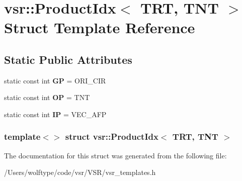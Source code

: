 \hypertarget{structvsr_1_1_product_idx_3_01_t_r_t_00_01_t_n_t_01_4}{\section{vsr\-:\-:Product\-Idx$<$ T\-R\-T, T\-N\-T $>$ Struct Template Reference}
\label{structvsr_1_1_product_idx_3_01_t_r_t_00_01_t_n_t_01_4}
}
\subsection*{Static Public Attributes}
\begin{DoxyCompactItemize}
\item 
\hypertarget{structvsr_1_1_product_idx_3_01_t_r_t_00_01_t_n_t_01_4_abb1338f7f5857b5386f5c8dcd7461cdd}{static const int {\bfseries G\-P} = O\-R\-I\-\_\-\-C\-I\-R}\label{structvsr_1_1_product_idx_3_01_t_r_t_00_01_t_n_t_01_4_abb1338f7f5857b5386f5c8dcd7461cdd}

\item 
\hypertarget{structvsr_1_1_product_idx_3_01_t_r_t_00_01_t_n_t_01_4_a8a05d397a7f773009cd628cd89eb754a}{static const int {\bfseries O\-P} = T\-N\-T}\label{structvsr_1_1_product_idx_3_01_t_r_t_00_01_t_n_t_01_4_a8a05d397a7f773009cd628cd89eb754a}

\item 
\hypertarget{structvsr_1_1_product_idx_3_01_t_r_t_00_01_t_n_t_01_4_ab37d02d0053629b34412a1d3708bcaf7}{static const int {\bfseries I\-P} = V\-E\-C\-\_\-\-A\-F\-P}\label{structvsr_1_1_product_idx_3_01_t_r_t_00_01_t_n_t_01_4_ab37d02d0053629b34412a1d3708bcaf7}

\end{DoxyCompactItemize}
\subsubsection*{template$<$$>$ struct vsr\-::\-Product\-Idx$<$ T\-R\-T, T\-N\-T $>$}



The documentation for this struct was generated from the following file\-:\begin{DoxyCompactItemize}
\item 
/\-Users/wolftype/code/vsr/\-V\-S\-R/vsr\-\_\-templates.\-h\end{DoxyCompactItemize}
